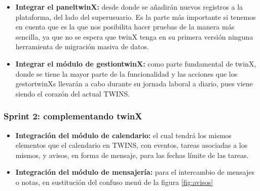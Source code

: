 \begin{itemize}
	\item \textbf{Integrar el \gls{paneltwinX}:} desde donde se añadirán nuevos registros a la plataforma, del lado del \gls{superusuario}. Es la parte más importante si tenemos en cuenta que es la que nos posibilita hacer pruebas de la manera más sencilla, ya que no se espera que twinX tenga en su primera versión ninguna herramienta de migración masiva de datos. 

	\item \textbf{Integrar el módulo de \gls{gestiontwinX}:} como parte fundamental de twinX, donde se tiene la mayor parte de la funcionalidad y las acciones que los \glspl{gestortwinX} llevarán a cabo durante su jornada laboral a diario, pues viene siendo el corazón del actual TWINS.
	
\end{itemize}

\subsubsection*{\textbf{Sprint 2: complementando twinX}}

\begin{itemize}
	\item \textbf{Integración del módulo de calendario:} el cual tendrá los mismos elementos que el calendario en TWINS, con eventos, tareas asociadas a los mismos, y avisos, en forma de mensaje, para las fechas límite de las tareas.
	\item \textbf{Integración del módulo de mensajería:} para el intercambio de mensajes o notas, en sustitución del confuso menú de la figura \ref{fig:avisos}
\end{itemize}

